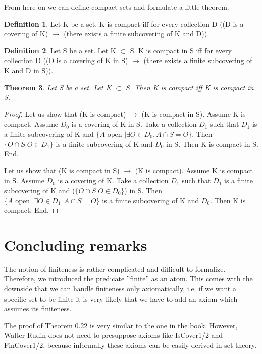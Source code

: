 \documentclass[10pt]{article}
\newenvironment{forthel}{\begin{leftbar}}{\end{leftbar}}
\newcommand{\embed}[2]{ \{ A \text{ open } | \exists O\in #1 .\, A\cap #2 = O\}}
\newcommand{\capcap}[2]{ \{ O\cap #2 | O \in #1 \}}
\newcommand{\var}[2]{ #1_{#2}}
\newtheorem{theorem}{Theorem}[section]
\theoremstyle{definition}
\newtheorem{definition}[theorem]{Definition}
\theoremstyle{plain}
\theoremstyle{remark}
\begin{document}
From here on we can define compact sets and formulate a little theorem.
\begin{forthel}
\begin{definition}
	Let K be a set. 
	K is compact iff for every collection D ((D is a covering of K) $\rightarrow$ (there exists a finite subcovering of K and D)).
\end{definition}

\begin{definition}
	Let S be a set. Let K $\subset$ S. K is compact in S iff for every collection D ((D is a covering of K in S) $\rightarrow$ (there exists a finite subcovering of K and D in S)).
\end{definition}

\begin{theorem}
	Let S be a set. Let K $\subset$ S. Then K is compact iff K is compact in S.
\end{theorem}
\begin{proof}

	Let us show that (K is compact) $\rightarrow$ (K is compact in S).
		Assume K is compact. Assume $\var D0$ is a covering of K in S.
		Take a collection $\var D1$ such that $\var D1$ is a finite subcovering of K and $\embed{\var D0}{S}$.
		Then $\capcap{\var D1}{S}$ is a finite subcovering of K and $\var D0$ in S.
		Then K is compact in S.
	End.

	Let us show that (K is compact in S) $\rightarrow$ (K is compact).
		Assume K is compact in S. Assume $\var D0$ is a covering of K.
		Take a collection $\var D1$ such that $\var D1$ is a finite subcovering of K and ($\capcap{\var D0}{S}$) in S.
		Then $\embed{\var D1}{S}$ is a finite subcovering of K and $\var D0$.
		Then K is compact.
	End.
\end{proof}
\end{forthel}
\section{Concluding remarks}
The notion of finiteness is rather complicated and difficult to formalize. Therefore, we introduced the predicate ''finite'' as an atom. This comes with the downside that we can handle finiteness only axiomatically, i.e. if we want a specific set to be finite it is very likely that we have to add an axiom which assumes its finiteness.

The proof of Theorem 0.22 is very similar to the one in the book. However, Walter Rudin does not need to presuppose axioms like IsCover1/2 and FinCover1/2, because informally these axioms can be easily derived in set theory.
\end{document}
